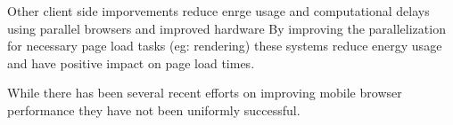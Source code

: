 Other client side imporvements reduce enrge usage and computational delays using parallel
browsers \cite{mai2012hotpar, meyerovich2010www} %
and improved hardware \cite{zhu2013hpca} %
 By improving the parallelization 
for necessary page load tasks (eg: rendering) these systems reduce energy usage
and have positive impact on page load times. 

While there has been several recent efforts on improving mobile browser performance
they have not been uniformly successful.

